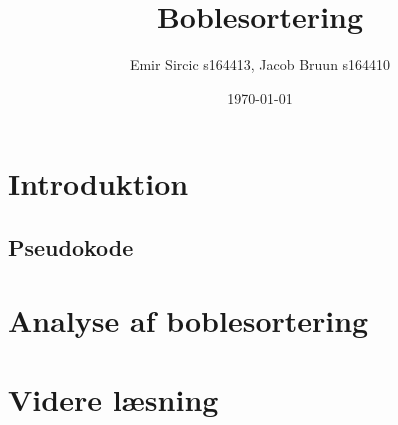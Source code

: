 \documentclass[a4paper]{article}
\title{Boblesortering}
\author{Emir Sircic s164413, Jacob Bruun s164410}
\date{\today}
\begin{document}
\maketitle

\section{Introduktion}
\subsection{Pseudokode}
\section{Analyse af boblesortering}
\section{Videre læsning}
\end{document}
